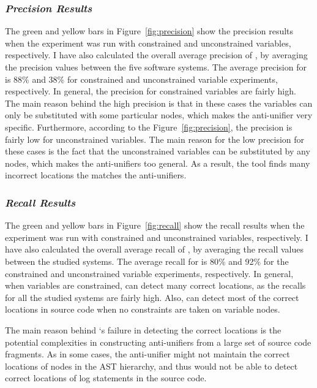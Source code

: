 \subsubsection{\emph{Precision Results}}  \label{precision-results}
The green and yellow bars in Figure~\ref{fig:precision}  show the precision results when the experiment was run with constrained and unconstrained variables, respectively. I have also calculated the overall average precision of , by averaging the precision values between the five software systems. The average precision for  is 88\% and 38\% for constrained and unconstrained variable experiments, respectively. In general, the precision for constrained variables are fairly high. The main reason behind the high precision is that in these cases the variables can only be substituted with some particular nodes, which makes the anti-unifier very specific. Furthermore, according to the Figure~\ref{fig:precision}, the precision is fairly low for unconstrained variables. The main reason for the low precision for these cases is the fact that the unconstrained variables can be substituted by any nodes, which makes the anti-unifiers too general. As a result, the tool finds many incorrect locations the matches the anti-unifiers.

\subsubsection{\emph{Recall Results}}  \label{recall-results}
The green and yellow bars in Figure~\ref{fig:recall}  show the recall results when the experiment was run with constrained and unconstrained variables, respectively. I have also calculated the overall average recall of , by averaging the recall values between the studied systems. The average recall for  is 80\% and 92\% for the constrained and unconstrained variable experiments, respectively. In general, when variables are constrained,  can detect many correct locations, as the recalls for all the studied systems are fairly high. Also,  can detect most of the correct locations in source code when no constraints are taken on variable nodes.

The main reason behind `s failure in detecting the correct locations is the potential complexities in constructing anti-unifiers from a large set of source code fragments. As in some cases, the anti-unifier might not maintain the correct locations of nodes in the AST hierarchy, and thus  would not be able to detect correct locations of log statements in the source code.


